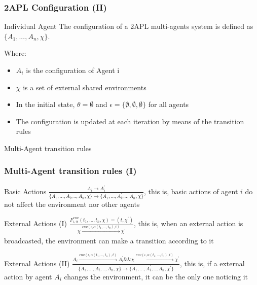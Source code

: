 \documentclass{beamer}
\begin{document}
\begin{frame}
\frametitle{2APL Configuration (II)}

\begin{block}{ Individual Agent}
The configuration of a 2APL multi-agents system is defined as $\{A_1,...,A_n, \chi\}$.
\end{block}
Where:
\begin{itemize}
\item $A_i$ is the configuration of Agent i
\item $\chi$ is a set of external shared environments
\item In the initial state, $\theta=\emptyset$ and $\epsilon=\{\emptyset,\emptyset,\emptyset\}$ for all agents
\item The configuration is updated at each iteration by means of the transition rules
\end{itemize}

\end{frame}

\begin{frame}
\Huge{\centerline{Multi-Agent transition rules}}
\end{frame}


\begin{frame}
\frametitle{Multi-Agent transition rules (I)}

\begin{block}{Basic Actions}
	$\frac{A_i \rightarrow A^{\prime}_i}{\{A_1,...,A_i,..,A_n,\chi\} \rightarrow \{A_1,...,A^{\prime}_i,..,A_n,\chi\}}$, this is, basic actions of agent $i$ do not affect the environment nor other agents 
\end{block}

\begin{block}{External Actions (I)}
	$\frac{F^{env}_{\iota,\alpha}(t_1,...,t_n,\chi) = (t, \chi^\prime)}{ \chi \xrightarrow[]{env(\iota,\alpha(t_1,...,t_n),t)} \chi^\prime}$, this is, when an external action is broadcasted, the environment can make a transition according to it
\end{block}

\begin{block}{External Actions (II)}
	$\frac{ A_i \xrightarrow[]{env(\iota,\alpha(t_1,...,t_n),t)} A^\prime_i \&\& \chi \xrightarrow[]{env(\iota,\alpha(t_1,...,t_n),t)} \chi^\prime}{\{A_1,...,A_i,..,A_n,\chi\} \rightarrow \{A_1,...,A^{\prime}_i,..,A_n,\chi^\prime\} }$, this is, if a external action by agent $A_i$ changes the environment, it can be the only one noticing it
\end{block}

\end{frame}
\end{document}
